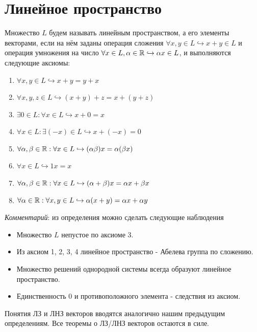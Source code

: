 \section{Линейное пространство}
\begin{definition}
\label{Аксиоматика линейного пространства.}
    Множество $L$ будем называть линейным пространством, а его элементы векторами, если на нём заданы операция сложения $\forall x,y \in L \hookrightarrow x+y \in L$ и операция умножения на число $\forall x \in L, \alpha \in \mathbb{R} \hookrightarrow \alpha x \in L$, и выполняются следующие аксиомы:
    \begin{enumerate}
        \item $\forall x, y \in L \hookrightarrow x+y=y+x$
        \item $\forall x, y, z \in L \hookrightarrow (x+y)+z=x+(y+z)$
        \item $\exists 0\in L:\forall x\in L \hookrightarrow x+0=x$
        \item $\forall x \in L:\exists (-x) \in L \hookrightarrow x+(-x)=0$
        \item $\forall \alpha, \beta \in \mathbb{R}: \forall x \in L \hookrightarrow (\alpha \beta)x=\alpha (\beta x)$
        \item $\forall x \in L \hookrightarrow 1x=x$
        \item $\forall \alpha, \beta \in \mathbb{R}: \forall x \in L \hookrightarrow (\alpha+\beta)x=\alpha x+\beta x$
        \item $\forall \alpha \in \mathbb{R}: \forall x, y \in L \hookrightarrow \alpha(x+y)=\alpha x+\alpha y$
    \end{enumerate}
\end{definition}
\textit{Комментарий}: из определения можно сделать следующие наблюдения
\begin{itemize}
    \item Множество $L$ непустое по аксиоме 3.
    \item Из аксиом 1, 2, 3, 4 линейное пространство - Абелева группа по сложению.
    \item Множество решений однородной системы всегда образуют линейное пространство.
    \item Единственность 0 и противоположного элемента - следствия из аксиом.
\end{itemize}

Понятия ЛЗ и ЛНЗ векторов вводятся аналогично нашим предыдущим определениям. Все теоремы о ЛЗ/ЛНЗ векторов остаются в силе.